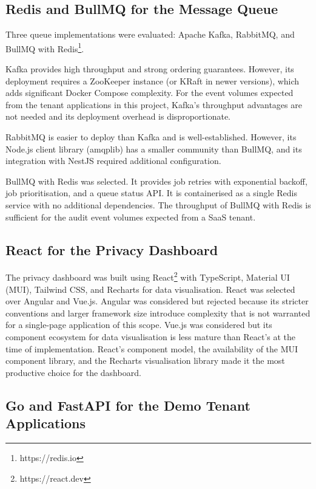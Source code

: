 \documentclass[a4paper,12pt,onecolumn]{report}
\begin{document}
\subsection{Redis and BullMQ for the Message Queue}

Three queue implementations were evaluated: Apache Kafka, RabbitMQ, and BullMQ with Redis\footnote{\label{redis}https://redis.io}.

Kafka provides high throughput and strong ordering guarantees.
However, its deployment requires a ZooKeeper instance (or KRaft in newer versions), which adds significant Docker Compose complexity.
For the event volumes expected from the tenant applications in this project, Kafka's throughput advantages are not needed and its deployment overhead is disproportionate.

RabbitMQ is easier to deploy than Kafka and is well-established.
However, its Node.js client library (amqplib) has a smaller community than BullMQ, and its integration with NestJS required additional configuration.

BullMQ with Redis was selected.
It provides job retries with exponential backoff, job prioritisation, and a queue status API.
It is containerised as a single Redis service with no additional dependencies.
The throughput of BullMQ with Redis is sufficient for the audit event volumes expected from a SaaS tenant.

\subsection{React for the Privacy Dashboard}

The privacy dashboard was built using React\footnote{\label{react}https://react.dev} with TypeScript, Material UI (MUI), Tailwind CSS, and Recharts for data visualisation.
React was selected over Angular and Vue.js.
Angular was considered but rejected because its stricter conventions and larger framework size introduce complexity that is not warranted for a single-page application of this scope.
Vue.js was considered but its component ecosystem for data visualisation is less mature than React's at the time of implementation.
React's component model, the availability of the MUI component library, and the Recharts visualisation library made it the most productive choice for the dashboard.

\subsection{Go and FastAPI for the Demo Tenant Applications}
\end{document}
